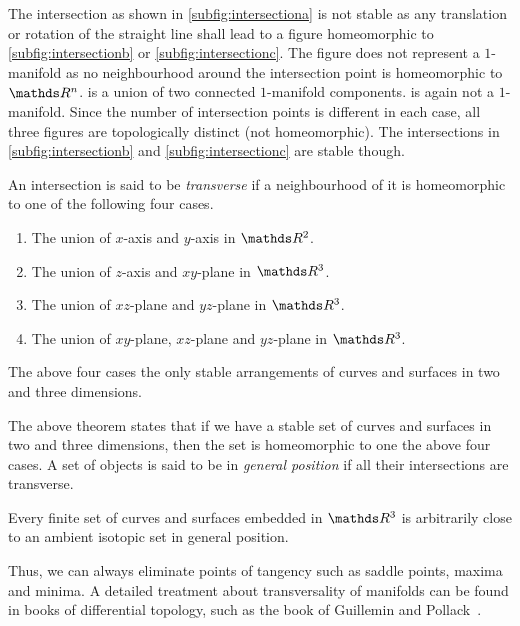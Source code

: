 The intersection as shown in \cref{subfig:intersectiona} is not stable as any translation or rotation of the straight line shall lead to a figure homeomorphic to \cref{subfig:intersectionb} or \cref{subfig:intersectionc}. The figure does not represent a \(1\)-manifold as no neighbourhood around the intersection point is homeomorphic to \(\R^n\).  is a union of two connected \(1\)-manifold components.  is again not a \(1\)-manifold. Since the number of intersection points is different in each case, all three figures are topologically distinct (not homeomorphic). The intersections in \cref{subfig:intersectionb} and \cref{subfig:intersectionc} are stable though.

\begin{defn}
    An intersection is said to be \textit{transverse} if a neighbourhood of it is homeomorphic to one of the following four cases.
    \begin{enumerate}
        \item The union of \(x\)-axis and \(y\)-axis in \(\R^2\).
        \item The union of \(z\)-axis and \(xy\)-plane in \(\R^3\).
        \item The union of \(xz\)-plane and \(yz\)-plane in \(\R^3\).
        \item The union of \(xy\)-plane, \(xz\)-plane and \(yz\)-plane in \(\R^3\).
    \end{enumerate}
\end{defn}

\begin{thm}
    The above four cases the only stable arrangements of curves and surfaces in two and three dimensions.
\end{thm}

The above theorem states that if we have a stable set of curves and surfaces in two and three dimensions, then the set is homeomorphic to one the above four cases. A set of objects is said to be in \textit{general position} if all their intersections are transverse.

\begin{thm}
    Every finite set of curves and surfaces embedded in \(\R^3\) is arbitrarily close to an ambient isotopic set in general position.
\end{thm}

Thus, we can always eliminate points of tangency such as saddle points, maxima and minima. A detailed treatment about transversality of manifolds can be found in books of differential topology, such as the book of Guillemin and Pollack~\cite{pollack}.

